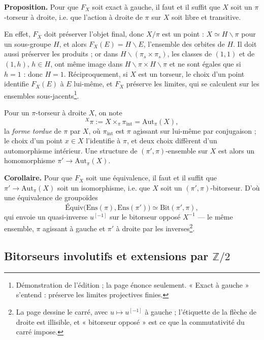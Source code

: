 \documentclass[11pt,a4paper]{article}
\begin{document}
\textbf{Proposition.} Pour que $F_X$ soit exact à gauche, il faut et il suffit
que $X$ soit un $\pi$-torseur à droite, i.e. que l'action à droite de $\pi$ sur $X$
soit libre et transitive.

En effet, $F_X$ doit préserver l'objet final, donc $X/\pi$ est un point :
$X \simeq H\backslash\pi$ pour un sous-groupe $H$, et alors $F_X(E) = H\backslash E$,
l'ensemble des orbites de $H$. Il doit aussi préserver les produits ; or dans
$H\backslash(\pi_s \times \pi_s)$, les classes de $(1, 1)$ et de $(1, h)$, $h \in H$, ont
même image dans $H\backslash\pi \times H\backslash\pi$ et ne sont égales que si
$h = 1$ : donc $H = 1$. Réciproquement, si $X$ est un torseur, le choix d'un
point identifie $F_X(E)$ à $E$ lui-même, et $F_X$ préserve les limites, qui se
calculent sur les ensembles sous-jacents\footnote{Démonstration de l'édition ; la page énonce seulement.
« Exact à gauche » s'entend : préserve les limites projectives finies.}.

Pour un $\pi$-torseur à droite $X$, on note
\[
{}^{X}\pi := X \times_\pi \pi_{\mathrm{int}} = \mathrm{Aut}_\pi(X),
\]
la \emph{forme tordue} de $\pi$ par $X$, où $\pi_{\mathrm{int}}$ est $\pi$ agissant sur
lui-même par conjugaison ; le choix d'un point $x \in X$ l'identifie à $\pi$, et
deux choix diffèrent d'un automorphisme intérieur. Une structure de
$(\pi', \pi)$-ensemble sur $X$ est alors un homomorphisme $\pi' \to \mathrm{Aut}_\pi(X)$.

\textbf{Corollaire.} Pour que $F_X$ soit une équivalence, il faut et il suffit
que $\pi' \to \mathrm{Aut}_\pi(X)$ soit un isomorphisme, i.e. que $X$ soit un
$(\pi', \pi)$-bitorseur. D'où une équivalence de groupoïdes
\[
\text{Équiv}\bigl(\mathrm{Ens}(\pi), \mathrm{Ens}(\pi')\bigr) \simeq \mathrm{Bit}(\pi', \pi),
\]
qui envoie un quasi-inverse $u^{[-1]}$ sur le bitorseur opposé $X^{-1}$ — le même
ensemble, $\pi$ agissant à gauche et $\pi'$ à droite par les inverses\footnote{La
page dessine le carré, avec $u \mapsto u^{[-1]}$ à gauche ; l'étiquette de la
flèche de droite est illisible, et « bitorseur opposé » est ce que la
commutativité du carré impose.}.

\subsection*{Bitorseurs involutifs et extensions par $\mathbb{Z}/2$}
\end{document}
